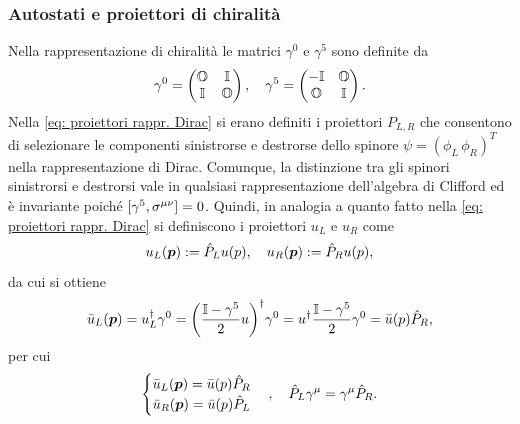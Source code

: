 \subsubsection{Autostati e proiettori di chiralità}
Nella rappresentazione di chiralità le matrici $\gamma^0$ e $\gamma^5$ sono definite da
\begin{equation}
    \gamma^0 = 
    \begin{pmatrix}
        \mathbb{O} & \mathbb{I} \\
        \mathbb{I} & \mathbb{O}
    \end{pmatrix},\quad \gamma^5 = 
    \begin{pmatrix}
        -\mathbb{I} & \mathbb{O} \\
        \mathbb{O} & \mathbb{I}
    \end{pmatrix}.
\end{equation}
Nella \eqref{eq: proiettori rappr. Dirac} si erano definiti i proiettori $P_{L,R}$ che consentono di selezionare le componenti sinistrorse e destrorse dello spinore $\psi = (\phi_L\,\phi_R)^T$ nella rappresentazione di Dirac. Comunque, la distinzione tra gli spinori sinistrorsi e destrorsi vale in qualsiasi rappresentazione dell'algebra di Clifford ed è invariante poiché $[\gamma^5,\sigma^{\mu\nu}] = 0$. Quindi, in analogia a quanto fatto nella \eqref{eq: proiettori rappr. Dirac} si definiscono i proiettori $u_L$ e $u_R$ come
\begin{equation}
    u_L(\bm{p}) := \hat{P}_Lu(p),\quad u_R(\bm{p}) := \hat{P}_Ru(p),
\end{equation}
da cui si ottiene
\begin{equation}
    \bar{u}_L(\bm{p}) = u^\dagger_L\gamma^0 = \bigg(\frac{\mathbb{I} - \gamma^5}{2}u\bigg)^\dagger\gamma^0 = u^\dagger\frac{\mathbb{I} - \gamma^5}{2}\gamma^0 = \bar{u}(p)\hat{P}_R,
\end{equation}
per cui
\begin{equation}
    \begin{cases}
        \bar{u}_L(\bm{p}) = \bar{u}(p)\hat{P}_R \\ \bar{u}_R(\bm{p}) = \bar{u}(p)\hat{P}_L
    \end{cases},\quad \hat{P}_L\gamma^\mu = \gamma^\mu\hat{P}_R.
\end{equation}

